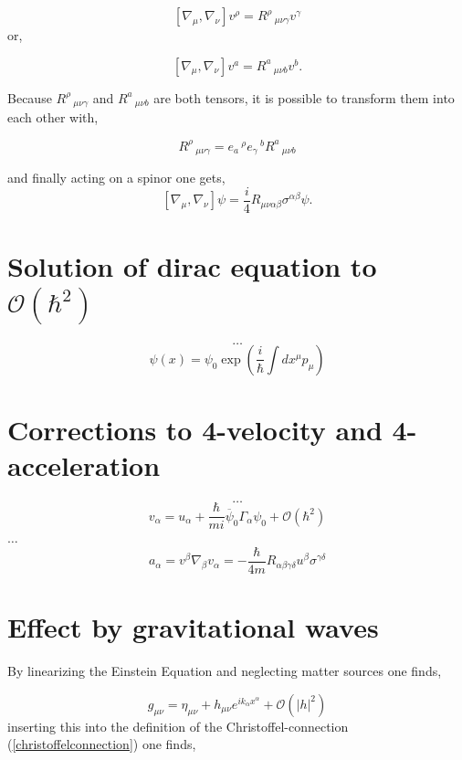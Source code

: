 \documentclass[12pt,a4paper]{article}
\begin{document}
	$$
	[\nabla_\mu, \nabla_\nu]v^\rho =  R^\rho\,_{\mu \nu \gamma } v^\gamma
	$$
	or,
	
	$$
	[\nabla_\mu, \nabla_\nu]v^a =  R^a\,_{\mu \nu b } v^b.
	$$
	
	Because $R^\rho\,_{\mu \nu \gamma }$ and $R^a\,_{\mu \nu b }$ are both tensors, it is possible to transform them into each other with,
	
	$$
	R^\rho\,_{\mu \nu \gamma } = e_a\,^\rho e_\gamma\,^b R^a\,_{\mu \nu b }
	$$
	
	and finally acting on a spinor one gets,
	$$
	[\nabla_\mu, \nabla_\nu]\psi = \frac{i}{4} R_{\mu \nu \alpha \beta} \sigma^{\alpha \beta} \psi.
	$$
	
	
	
	\section{Solution of dirac equation to $\mathcal{O} (\hbar^2)$}
	$$
	\ldots
	$$
	\begin{equation}
		\label{solution_to_diraceq}
		\psi(x) = \psi_0 \exp\left(\frac{i}{\hbar}\int dx^\mu p_\mu\right)
	\end{equation}
	\section{Corrections to 4-velocity and 4-acceleration}
	$$
	\ldots
	$$
	\begin{equation}
		\label{correction_to_v}
		v_\alpha = u_\alpha + \frac{\hbar}{mi}\overbar{\psi}_0 \Gamma_\alpha \psi_0 +\mathcal{O} (\hbar^2)
	\end{equation}
	$\ldots$
	\begin{equation}
		\label{correction_to_a}
		a_\alpha = v^\beta \nabla_\beta v_\alpha =  -\frac{\hbar}{4m} R_{\alpha \beta \gamma \delta}u^\beta \sigma^{\gamma \delta}
	\end{equation}
	
	
	
	\section{Effect by gravitational waves}
	By linearizing the Einstein Equation and neglecting matter sources one finds,
	
	$$
	g_{\mu \nu } = \eta_{\mu \nu } + h_{\mu \nu }e^{i k_\alpha x^\alpha} + \mathcal{O}(|h|^2)
	$$
	inserting this into the definition of the Christoffel-connection (\ref{christoffelconnection}) one finds,
	
\end{document}

